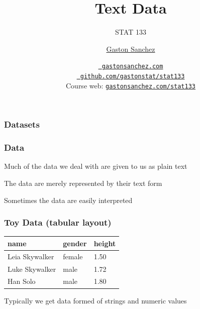 \documentclass[12pt]{beamer}\usepackage[]{graphicx}\usepackage[]{color}
\title{Text Data}
\subtitle{STAT 133}
\author{\href{http://www.gastonsanchez.com}{Gaston Sanchez}}
\institute{Department of Statistics, UC{\textendash}Berkeley}
\date{\href{http://www.gastonsanchez.com}{\tt \scriptsize \color{foreground} gastonsanchez.com}
\\[-4pt]
\href{http://github.com/gastonstat/stat133}{\tt \scriptsize \color{foreground} github.com/gastonstat/stat133}
\\[-4pt]
{\scriptsize Course web: \href{http://www.gastonsanchez.com/stat133}{\tt gastonsanchez.com/stat133}}
}
\begin{document}
{
  \frame{
    \titlepage
  } 
}


\begin{frame}
\begin{center}
\Huge{}
\end{center}
\end{frame}


\begin{frame}
\frametitle{Datasets}

\eb
\begin{center}
\end{center}

\end{frame}


\begin{frame}
\frametitle{Data}

\bbi
  \item Much of the data we deal with are given to us as plain text
  \item The data are merely represented by their text form
  \item Sometimes the data are easily interpreted
\ei

\end{frame}


\begin{frame}[fragile]
\frametitle{Toy Data (tabular layout)}

\begin{center}
 \begin{tabular}{| l | l | l |}
  \hline
name & gender & height \\
  \hline
Leia Skywalker & female & 1.50 \\
  \hline
Luke Skywalker & male & 1.72 \\
  \hline
Han Solo & male & 1.80 \\
  \hline
 \end{tabular}
\end{center}

\bigskip
Typically we get data formed of strings and numeric values

\end{frame}
\end{document}
